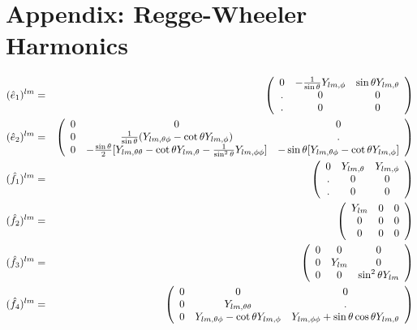 \section{Appendix: Regge-Wheeler Harmonics}

\label{reggewheeler}

\begin{eqnarray*}
(\hat{e}_1)^{lm} &=& 
\left( \begin{array}{ccc}
0  & -\frac{1}{\sin\theta}Y_{lm,\phi} & \sin\theta Y_{lm,\theta} \\
.  & 0                                & 0                        \\
.  & 0                                & 0 
\end{array}\right)
\\
(\hat{e}_2)^{lm} &=& 
\left( \begin{array}{ccc} 
0 & 0 & 0 \\
0 & \frac{1}{\sin\theta}(Y_{lm,\theta\phi}-\cot\theta Y_{lm,\phi}) & . \\
0 & -\frac{\sin\theta}{2}[Y_{lm,\theta\theta}-\cot\theta 
    Y_{lm,\theta}-\frac{1}{\sin^2\theta}Y_{lm,\phi\phi}]           & 
            -\sin\theta [Y_{lm,\theta\phi}-\cot\theta Y_{lm,\phi}]
\end{array}\right)
\\
(\hat{f}_1)^{lm} &=& 
\left( \begin{array}{ccc}
  0 & Y_{lm,\theta} & Y_{lm,\phi} \\
  . & 0   & 0           \\
  . & 0   & 0 
\end{array}\right)
\\
(\hat{f}_2)^{lm} &=& 
\left( \begin{array}{ccc}
Y_{lm} & 0 & 0 \\
0      & 0 & 0 \\
0      & 0 & 0 
\end{array}\right)
\\
(\hat{f}_3)^{lm} &=& 
\left( \begin{array}{ccc}
0 & 0  & 0                  \\
0 & Y_{lm} & 0                  \\
0 & 0  & \sin^2\theta Y_{lm} 
\end{array}\right)
\\
(\hat{f}_4)^{lm} &=& 
\left( \begin{array}{ccc}
0 & 0                   & 0 \\
0 & Y_{lm,\theta\theta} & . \\
0 & Y_{lm,\theta\phi}-\cot \theta Y_{lm,\phi} & Y_{lm,\phi\phi}+ \sin\theta \cos\theta Y_{lm,\theta}
\end{array}\right)
\end{eqnarray*}

